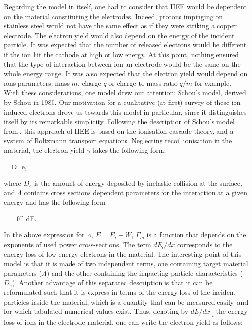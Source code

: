 \noindent Regarding the model in itself, one had to consider that IIEE would be dependent on the material constituting the electrodes. Indeed, protons impinging on stainless steel would not have the same effect as if they were striking a copper electrode. The electron yield would also depend on the energy of the incident particle. It was expected that the number of released electrons would be different if the ion hit the cathode at high or low energy. At this point, nothing ensured that the type of interaction between ion an electrode would be the same on the whole energy range. It was also expected that the electron yield would depend on ions parameters: mass $m$, charge $q$ or charge to mass ratio $q/m$ for example.\\

\noindent With these considerations, one model drew our attention: Schou's model, derived by Schou in 1980. Our motivation for a qualitative (at first) survey of these ion-induced electrons drove us towards this model in particular, since it distinguishes itself by its remarkable simplicity. Following the description of Schou's model from \cite{HasselII}, this approach of IIEE is based on the ionisation cascade theory, and a system of Boltzmann transport equations.  Neglecting recoil ionisation in the material, the electron yield $\gamma$ takes the following form: 

\beq
\gamma = \Lambda \cdot D_e,
\eeq

\noindent where $D_e$ is the amount of energy deposited by inelastic collision at the surface, and $\Lambda$ contains cross sections dependent parameters for the interaction at a given energy and has the following form 

\beq
\Lambda = \int_0^{\infty} dE.
\eeq

\noindent In the above expression for $\Lambda$, $E=E_i-W$, $\Gamma_m$ is a function that depends on the exponents of used power cross-sections. The term $dE_i/dx$ corresponds to the energy loss of low-energy electrons in the material. The interesting point of this model is that it is made of two independent terms, one containing target material parameters ($\Lambda$) and the other containing the impacting particle characteristics ($D_e$). Another advantage of this separated description is that it can be reformulated such that it is express in terms of the energy loss of the incident particles inside the material, which is a quantity that can be measured easily, and for which tabulated numerical values exist. Thus, denoting by $dE/dx\Big|_i$ the energy loss of ions in the electrode material, one can write the electron yield as follows: 

